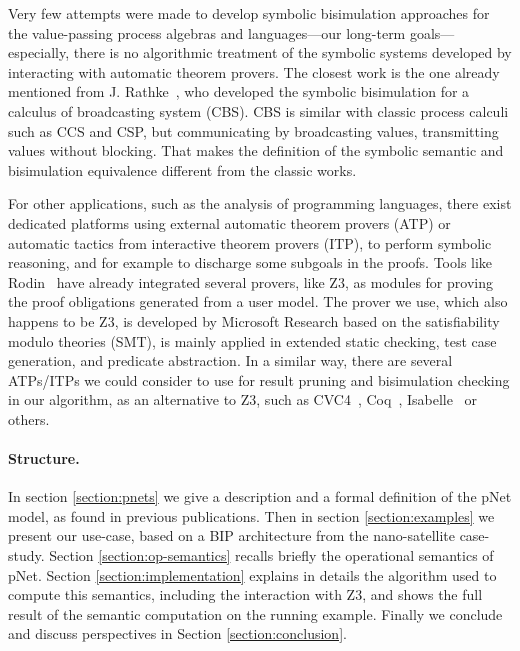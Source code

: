 \documentclass{lncs/llncs}
\newcommand{\mdash}{---}
\begin{document}
Very few attempts were made to develop symbolic bisimulation approaches
for the value-passing process algebras and languages\mdash our long-term goals\mdash
especially, there is no algorithmic treatment of the symbolic systems developed by
interacting with automatic theorem provers. The closest work is the
one already mentioned from J. Rathke~\cite{HennessyRathke:TCS98},
who developed the symbolic bisimulation for a
calculus of broadcasting system (CBS). CBS is similar with classic
process calculi such as CCS and CSP, but communicating by broadcasting
values, %
transmitting values without blocking. That makes the definition of
the symbolic semantic and bisimulation equivalence different from the
classic works.


For other applications, such as the analysis of 
programming languages, there exist dedicated platforms using
external automatic theorem 
provers (ATP) or automatic tactics from interactive theorem
provers (ITP), to perform symbolic reasoning, and for example to
discharge some subgoals in the proofs.
Tools like Rodin~\cite{deharbe2013,deharbe2014,abrial2007} have
already integrated several provers, like Z3, as modules for proving
the proof obligations generated from a user model. 
The prover we use, which also happens to be Z3, is developed by Microsoft Research
based on the satisfiability modulo 
theories (SMT), is mainly applied in extended static checking, test case
generation, and predicate abstraction.
In a similar way, there are several ATPs/ITPs we could consider to use for
result pruning and bisimulation checking in our algorithm, as an
alternative to Z3, such as CVC4~\cite{barrett:CAV2011},
Coq~\cite{armand:CPP2011},
Isabelle~\cite{blanchette:FroCoS2011} or others. 


\paragraph{Structure.}
In section
\ref{section:pnets} we give a description and a formal definition of
the pNet model, as found in previous publications. Then in section
\ref{section:examples} we present our use-case, based on a BIP
architecture from the nano-satellite case-study. 
Section \ref{section:op-semantics} recalls briefly the operational semantics
of pNet.
Section \ref{section:implementation} explains in details the algorithm
used to compute this semantics, including the interaction with Z3, and
shows the full result of the semantic computation on the running example.
Finally we conclude and discuss perspectives in Section
\ref{section:conclusion}. 
\end{document}
